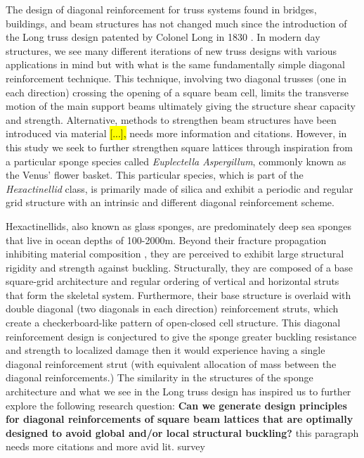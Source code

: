 \documentclass[9pt,twocolumn,twoside]{fernandes_paper}
\newcommand{\mf}[1]{\colorbox{blue!10}{\color{color3}#1}}
\begin{document}
The design of diagonal reinforcement for truss systems found in bridges, buildings, and beam structures has not changed much since the introduction of the Long truss design patented by Colonel Long in 1830 \citep{waddell1916}. In modern day structures, we see many different iterations of new truss designs with various applications in mind but with what is the same fundamentally simple diagonal reinforcement technique. This technique, involving two diagonal trusses (one in each direction) crossing the opening of a square beam cell, limits the transverse motion of the main support beams ultimately giving the structure shear capacity and strength. Alternative, methods to strengthen beam structures have been introduced via material \hl{[...],} \mf{needs more information and citations}. However, in this study we seek to further strengthen square lattices through inspiration from a particular sponge species called \textit{Euplectella Aspergillum}, commonly known as the Venus' flower basket. This particular species, which is part of the \textit{Hexactinellid} class, is primarily made of silica and exhibit a periodic and regular grid structure with an intrinsic and different diagonal reinforcement scheme. 

Hexactinellids, also known as glass sponges, are predominately deep sea sponges that live in ocean depths of 100-2000m. Beyond their fracture propagation inhibiting material composition \citep{weaver2007}, they are perceived to exhibit large structural rigidity and strength against buckling. 
Structurally, they are composed of a base square-grid architecture and regular ordering of vertical and horizontal struts that form the skeletal system. Furthermore, their base structure is overlaid with double diagonal (two diagonals in each direction) reinforcement struts, which create a checkerboard-like pattern of open-closed cell structure. This diagonal reinforcement design is conjectured to give the sponge greater buckling resistance and strength to localized damage then it would experience having a single diagonal reinforcement strut (with equivalent allocation of mass between the diagonal reinforcements.) 
The similarity in the structures of the sponge architecture and what we see in the Long truss design has inspired us to further explore the following research question: \textbf{Can we generate design principles for diagonal reinforcements of square beam lattices that are optimally designed to avoid global and/or local structural buckling?} \mf{this paragraph needs more citations and more avid lit. survey}
\end{document}
